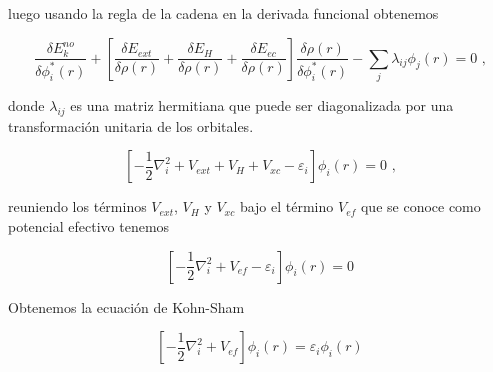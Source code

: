 \noindent luego usando la regla de la cadena en 
la derivada funcional obtenemos

\begin{equation}
\frac{\delta E_{k}^{no}}{\delta \phi _{i}^{\ast }(r)} + \left[ \frac{\delta 
    E_{ext}}{\delta \rho (r)} + \frac{\delta E_{H}}{\delta \rho (r)} + 
\frac{\delta E_{ec}}{\delta \rho (r)} \right]\frac{\delta \rho (r)}{\delta 
    \phi _{i}^{\ast }(r)} - \sum _{j} \lambda_{ij} \phi _{j}(r) = 0 \textrm{ ,}
\end{equation}

\noindent donde $\lambda_{ij}$ es una matriz hermitiana que puede ser 
diagonalizada por una transformaci\'on unitaria de los orbitales.

\begin{equation}
    \left[ -\frac{1}{2} \nabla_{i}^{2} + V_{ext}  + V_{H} + V_{xc} - 
    \varepsilon_{i} \right] \phi_{i}(r) = 0 \textrm{ ,}
\end{equation}

\noindent reuniendo los t\'erminos $V_{ext}$, $V_{H}$ y $V_{xc}$ bajo el 
t\'ermino $V_{ef}$ que se conoce como potencial efectivo tenemos

\begin{equation}
    \left[ -\frac{1}{2}\nabla_{i}^{2} + V_{ef} - 
    \varepsilon_{i} \right] \phi_{i}(r) = 0
\end{equation}

\noindent Obtenemos la ecuaci\'on de Kohn-Sham

\begin{equation}
    \left[ -\frac{1}{2}\nabla_{i}^{2} + V_{ef} \right] \phi_{i}(r) = 
    \varepsilon_{i} \phi_{i}(r)
\end{equation}
